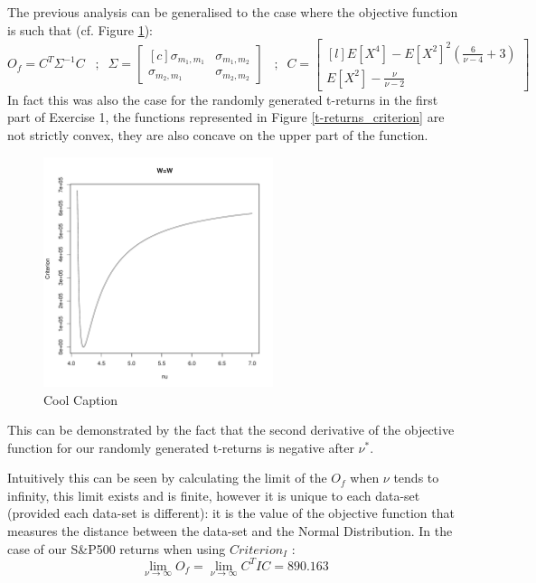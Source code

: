 The previous analysis can be generalised to the case where the objective function is such that (cf. Figure \ref{ConcavitySPW}):
\begin{equation*}
    O_f = C^T \Sigma^{-1} C \; \; \; ; \; \;
        \Sigma=
    \begin{bmatrix}[c]
        \sigma_{m_1,m_1}    & \sigma_{m_1,m_2} \\
        \sigma_{m_2,m_1}    & \sigma_{m_2,m_2}
    \end{bmatrix}
    \;\;\; ; \; \; C = 
    \begin{bmatrix}[l]
        E[X^4]-E[X^2]^2(\frac{6}{\nu-4}+3)  \\
        E[X^2]-\frac{\nu}{\nu-2}
    \end{bmatrix}
\end{equation*}
In fact this was also the case for the randomly generated t-returns in the first part of Exercise 1, the functions represented in Figure \ref{t-returns_criterion} are not strictly convex, they are also concave on the upper part of the function.
\begin{figure}
    \centering
    \includegraphics[width=0.6\textwidth]{ConcavityS&PW.pdf}
    \caption{Cool Caption}
    \label{ConcavitySPW}
\end{figure}
This can be demonstrated by the fact that the second derivative of the objective function for our randomly generated t-returns is negative after $\nu^*$.
\smallskip\par
Intuitively this can be seen by calculating the limit of the $O_f$ when $\nu$ tends to infinity, this limit exists and is finite, however it is unique to each data-set (provided each data-set is different): it is the value of the objective function that measures the distance between the data-set and the Normal Distribution. In the case of our S\&P500 returns when using $Criterion_I$ :
\begin{equation*}
    \lim_{\nu \to \infty}O_f = \lim_{\nu \to \infty}C^T I C = 890.163
\end{equation*}
